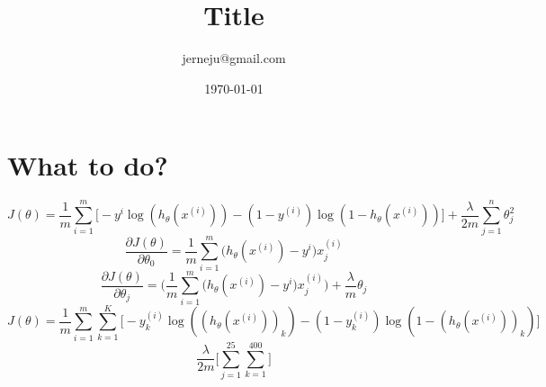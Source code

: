 \documentclass[a4paper]{article}
\begin{document}
\title{Title}

\author{jerneju@gmail.com}

\date{\today}



\maketitle

\section{What to do?}
	\begin{equation}
		J(\theta) = \frac{1}{m}\sum_{i=1}^m \big[-y^{i} \log (h_{\theta} (x^{(i)}))
		- (1 - y^{(i)}) \log(1 - h_{\theta}(x^{(i)}))\big]
		+ \frac{\lambda}{2 m} \sum_{j=1}^n \theta_j^2
	\end{equation}
	\begin{equation}
		\frac{\partial J(\theta)}{\partial \theta_0} = \frac{1}{m} \sum_{i=1}^m
		\big(h_{\theta}(x^{(i)}) - y^{i}\big) x_j^{(i)}
	\end{equation}
	\begin{equation}
		\frac{\partial J(\theta)}{\partial \theta_j} = \bigg(\frac{1}{m} \sum_{i=1}^m
		\big(h_{\theta}(x^{(i)}) - y^{i}\big) x_j^{(i)}\bigg) + \frac{\lambda}{m} \theta_j
	\end{equation}
	\begin{equation}
		J(\theta) = \frac{1}{m}\sum_{i=1}^m \sum_{k=1}^K \bigg[-y_k^{(i)} 
		\log ((h_{\theta}(x^{(i)}))_k) - (1 - y_k^{(i)}) 
		\log (1 - (h_{\theta}(x^{(i)}))_k)\bigg]
	\end{equation}
	\begin{equation}
		\frac{\lambda}{2 m} \bigg[\sum_{j=1}^{25} \sum_{k=1}^{400}\bigg]
	\end{equation}
\end{document}
